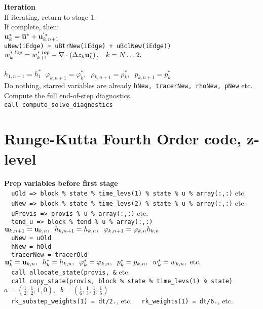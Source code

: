\documentclass[11pt]{report}
\begin{document}
{\bf Iteration} \\
If iterating, return to stage 1.  \\
If complete, then:\\
\verb||${\bf u}^*_k = \overline{\bf u}^* + {\bf u}^{'*}_{k,n+1} $\\
\verb|uNew(iEdge) = uBtrNew(iEdge) + uBclNew(iEdge))|\\
$w^{*\; top}_k 
= w^{*\; top}_{k+1} 
- \nabla \cdot \left( \Delta z_k {\bf u}^*_k \right), \;\;\; k=N\ldots 2.$\\
\verb|  |\\
$h_{1,n+1} = h_1^*\;\;
{\varphi}_{k,n+1} = {\varphi}_k^*,\;\;
\rho_{k,n+1}=\rho_k^*, \;\;
p_{k,n+1}=p_k^* $\\
Do nothing, starred variables are already \verb|hNew, tracerNew, rhoNew, pNew| etc.\\
Compute the full end-of-step diagnostics.\\
\verb|call compute_solve_diagnostics|

\newpage
\section{Runge-Kutta Fourth Order code, z-level}
{\bf Prep variables before first stage}\\
\verb|  uOld => block % state % time_levs(1) % state % u % array(:,:)| etc.\\
\verb|  uNew => block % state % time_levs(2) % state % u % array(:,:)| etc.\\
\verb|  uProvis => provis % u % array(:,:)| etc.\\
\verb|  tend_u => block % tend % u % array(:,:)|\\
${\bf u}_{k,n+1}={\bf u}_{k,n}, \;\;
h_{k,n+1}=h_{k,n},\;\;
{\varphi}_{k,n+1} = {\varphi}_{k,n} h_{k,n}$\\
\verb|  uNew = uOld|\\
\verb|  hNew = hOld|\\
\verb|  tracerNew = tracerOld|\\
${\bf u}_k^*={\bf u}_{k,n}, \;\;
h_k^*=h_{k,n},\;\;
{\varphi}_k^* = {\varphi}_{k,n}, \;\;
p_k^*=p_{k,n},\;\;
w_k^*=w_{k,n},\mbox{ etc.}$\\
\verb|  call allocate_state(provis, &| etc.\\
\verb|  call copy_state(provis, block % state % time_levs(1) % state)|\\
$a = \left(\frac{1}{2},\frac{1}{2},1,0 \right),\;\;
b = \left(\frac{1}{6},\frac{1}{3},\frac{1}{3},\frac{1}{6}\right)$\\
\verb|  rk_substep_weights(1) = dt/2.|, etc.  \verb|  rk_weights(1) = dt/6.|, etc.\\
\end{document}
